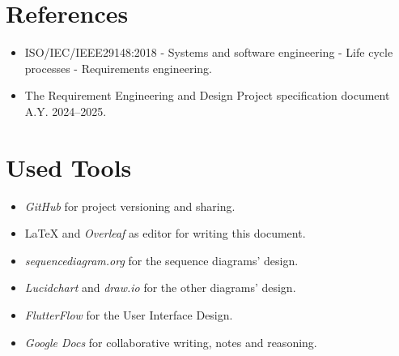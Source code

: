 \section{References}
\label{sec:references}%

\begin{itemize}
    \item ISO/IEC/IEEE29148:2018 - Systems and software engineering - Life cycle processes - Requirements engineering.
    \item The Requirement Engineering and Design Project specification document A.Y. 2024–2025. 
\end{itemize}

\section{Used Tools}
\label{sec:used_tools}%
\begin{itemize}
    \item \textit{GitHub} for project versioning and sharing.
    \item \LaTeX{} and \textit{Overleaf} as editor for writing this document.
    \item \textit{sequencediagram.org} for the sequence diagrams' design.
    \item \textit{Lucidchart} and \textit{draw.io} for the other diagrams' design.
    \item \textit{FlutterFlow} for the User Interface Design.
    \item \textit{Google Docs} for collaborative writing, notes and reasoning.
\end{itemize}
